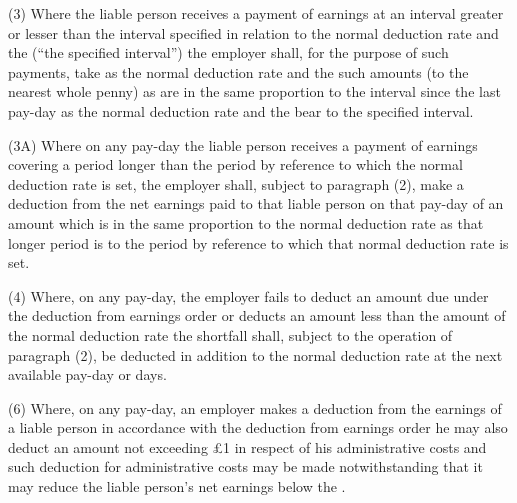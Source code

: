 \documentclass[12pt,a4paper]{article}
\begin{document}
(3) Where the liable person receives a payment of earnings at an interval greater or lesser than the interval specified in relation to the normal deduction rate and the 
(“the specified interval”) the employer shall, for the purpose of such payments, take as the normal deduction rate and the  
such amounts (to the nearest whole penny) as are in the same proportion to the interval since the last pay-day as the normal deduction rate and the  
bear to the specified interval.

(3A) Where on any pay-day the liable person receives a payment of earnings covering a period longer than the period by reference to which the normal deduction rate is set, the employer shall, subject to paragraph (2), make a deduction from the net earnings paid to that liable person on that pay-day of an amount which is in the same proportion to the normal deduction rate as that longer period is to the period by reference to which that normal deduction rate is set.

(4) Where, on any pay-day, the employer fails to deduct an amount due under the deduction from earnings order or deducts an amount less than the amount of the normal deduction rate the shortfall shall, subject to the operation of paragraph (2), be deducted in addition to the normal deduction rate at the next available pay-day or days.


(6) Where, on any pay-day, an employer makes a deduction from the earnings of a liable person in accordance with the deduction from earnings order he may also deduct an amount not exceeding £1 in respect of his administrative costs and such deduction for administrative costs may be made notwithstanding that it may reduce the liable person’s net earnings below the  
.  %
\end{document}
